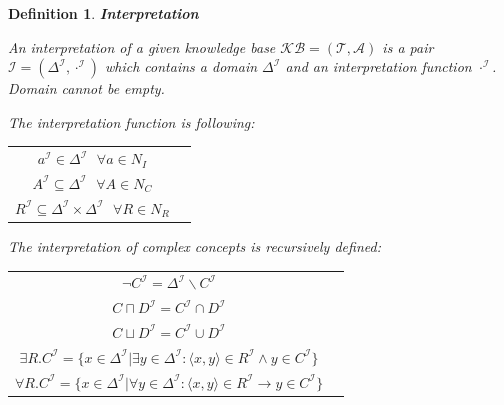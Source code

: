 \documentclass[12pt,a4paper]{article}
\newtheorem{definition}{Definition}[subsection]
\begin{document}
\begin{definition}{\textbf{Interpretation}}
	\label{def:interpretation}

	An interpretation of a given knowledge base $\mathcal{KB} = (\mathcal{T}, \mathcal{A})$ is a pair $\mathcal{I} = (\Delta^{\mathcal{I}}, \cdot ^{\mathcal{I}})$ which contains a domain $\Delta^{\mathcal{I}}$ and an interpretation function $\cdot ^{\mathcal{I}}$.	
	Domain cannot be empty.
		
	The interpretation function is following:
	
	\begin{table}[H]
		\centering
		\begin{tabular}{c c}
			$ a^{\mathcal{I}} \in \Delta^{\mathcal{I}} \text{ } \forall a \in N_{I} $ \\ \addlinespace[0.4cm]
			 $A^{\mathcal{I}} \subseteq \Delta^{\mathcal{I}} \text{ } \forall A \in N_{C} $ \\
			\addlinespace[0.4cm]
			$ R^{\mathcal{I}} \subseteq \Delta^{\mathcal{I}} \times \Delta^{\mathcal{I}} \text{ } \forall R \in N_{R} $ \\
		\end{tabular}		
	\end{table}

\newpage	
	The interpretation of complex concepts is recursively defined:

	\begin{table}[H]
		\centering
		\begin{tabular}{c c}
			$ \neg C^{\mathcal{I}} = \Delta^{\mathcal{I}} \backslash C^{\mathcal{I}} $ \\ \addlinespace[0.4cm]
			$ C \sqcap D^{\mathcal{I}} = C^{\mathcal{I}} \cap D^{\mathcal{I}} $ \\
			\addlinespace[0.4cm]
			$ C \sqcup D^{\mathcal{I}} = C^{\mathcal{I}} \cup D^{\mathcal{I}} $ \\
			\addlinespace[0.4cm]
			$ \exists R.C^{\mathcal{I}} = \{ x \in \Delta^{\mathcal{I}} | \exists y \in \Delta^{\mathcal{I}} : \langle x,y \rangle \in R^{\mathcal{I}} \land y \in C^{\mathcal{I}} \} $ \\
			\addlinespace[0.4cm]
			$ \forall R.C^{\mathcal{I}} = \{ x \in \Delta^{\mathcal{I}} | \forall y \in \Delta^{\mathcal{I}} : \langle x,y \rangle \in R^{\mathcal{I}} \rightarrow y \in C^{\mathcal{I}} \} $								
		\end{tabular}		
	\end{table}
		
\end{definition}
\end{document}
